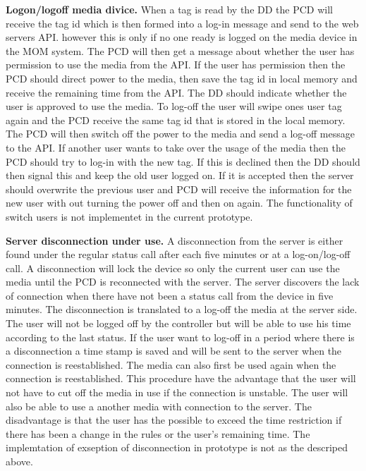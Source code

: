 \textbf{Logon/logoff media divice.} \newline
When a tag is read by the DD the PCD will receive the tag id which is then formed into a log-in message and send to the web servers API. however this is only if no one ready is logged on the media device in the MOM system. The PCD will then get a message about whether the user has permission to use the media from the API. If the user has permission then the PCD should direct power to the media, then save the tag id in local memory and receive the remaining time from the API. The DD should indicate whether the user is approved to use the media.\newline 
To log-off the user will swipe ones user tag again and the PCD receive the same tag id that is stored in the local memory. The PCD will then switch off the power to the media and send a log-off message to the API. \newline
If another user wants to take over the usage of the media then the PCD should try to log-in with the new tag. If this is declined then the DD should then signal this and keep the old user logged on. If it is accepted then the server should overwrite the previous user and PCD will receive the information for the new user with out turning the power off and then on again.\newline 
The functionality of switch users is not implementet in the current prototype.\newline

\textbf{Server disconnection under use.} \newline
A disconnection from the server is either found under the regular status call after each five minutes or at a log-on/log-off call. A disconnection will lock the device so only the current user can use the media until the PCD is reconnected with the server. The server discovers the lack of connection when there have not been a status call from the device in five minutes. The disconnection is translated to a log-off the media at the server side. 
The user will not be logged off by the controller but will be able to use his time according to the last status. If the user want to log-off in a period where there is a disconnection a time stamp is saved and will be sent to the server when the connection is reestablished. The media can also first be used again when the connection is reestablished. 
This procedure have the advantage that the user will not have to cut off the media in use if the connection is unstable. The user will also be able to use a another media with connection to the server.
The disadvantage is that the user has the possible to exceed the time restriction if there has been a change in the rules or the user's remaining time. \newline
The implemtation of exseption of disconnection in prototype is not as the descriped above. \newline 
	